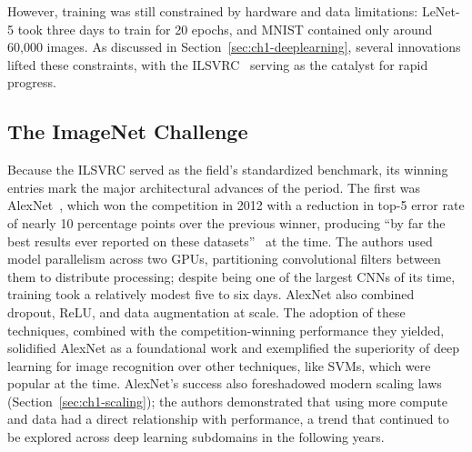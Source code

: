 However, training was still constrained by hardware and data limitations: LeNet-5 took three days to train for 20 epochs, and MNIST contained only around 60,000 images. As discussed in Section~\ref{sec:ch1-deeplearning}, several innovations lifted these constraints, with the ILSVRC~\cite{ILSVRC15} serving as the catalyst for rapid progress.

\subsection{The ImageNet Challenge}\label{sec:ch1-imagenet}
Because the ILSVRC served as the field's standardized benchmark, its winning entries mark the major architectural advances of the period. The first was AlexNet~\cite{krizhevsky2012imagenet}, which won the competition in 2012 with a reduction in top-5 error rate of nearly 10 percentage points over the previous winner, producing ``by far the best results ever reported on these datasets''~\cite{krizhevsky2012imagenet} at the time. The authors used model parallelism across two GPUs, partitioning convolutional filters between them to distribute processing; despite being one of the largest CNNs of its time, training took a relatively modest five to six days. AlexNet also combined dropout, ReLU, and data augmentation at scale. The adoption of these techniques, combined with the competition-winning performance they yielded, solidified AlexNet as a foundational work and exemplified the superiority of deep learning for image recognition over other techniques, like SVMs, which were popular at the time. AlexNet's success also foreshadowed modern scaling laws (Section~\ref{sec:ch1-scaling}); the authors demonstrated that using more compute and data had a direct relationship with performance, a trend that continued to be explored across deep learning subdomains in the following years.

